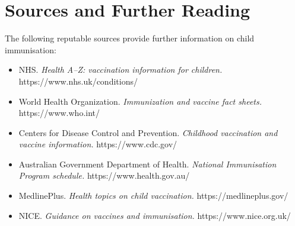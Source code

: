 \section*{Sources and Further Reading}
The following reputable sources provide further information on child immunisation:
\begin{itemize}
    \item NHS. \textit{Health A--Z: vaccination information for children.} https://www.nhs.uk/conditions/
    \item World Health Organization. \textit{Immunization and vaccine fact sheets.} https://www.who.int/
    \item Centers for Disease Control and Prevention. \textit{Childhood vaccination and vaccine information.} https://www.cdc.gov/
    \item Australian Government Department of Health. \textit{National Immunisation Program schedule.} https://www.health.gov.au/
    \item MedlinePlus. \textit{Health topics on child vaccination.} https://medlineplus.gov/
    \item NICE. \textit{Guidance on vaccines and immunisation.} https://www.nice.org.uk/
\end{itemize}
